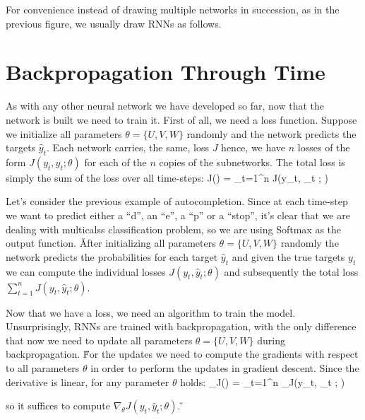For convenience instead of drawing multiple networks in succession, as in the previous figure, we usually draw RNNs as
follows.

\vspace{-5pt}


\section{Backpropagation Through Time}

As with any other neural network we have developed so far, now that the network is built we need to train it. First of
all, we need a loss function. Suppose we initialize all parameters $\theta = \{U, V, W\}$ randomly and the network
predicts the targets $\hat{y}_t$. Each network carries, the same, loss $J$ hence, we have $n$ losses of the form
$J(y_t, \hat{y}_t ; \theta)$ for each of the $n$ copies of the subnetworks. The total loss is simply the sum of the
loss over all time-steps:
\bse
J(\theta) = \sum_{t=1}^{n} J(y_t, _t ; \theta)
\ese

\be
Let's consider the previous example of autocompletion. Since at each time-step we want to predict either a ``d'', an
``e'', a ``p'' or a ``stop'', it's clear that we are dealing with multicalss classification problem, so we are using
Softmax as the output function. \v

After initializing all parameters $\theta = \{U, V, W\}$ randomly the network predicts the probabilities for each
target $\hat{y}_t$ and given the true targets $y_t$ we can compute the individual losses $J(y_t, \hat{y}_t ; \theta)$
and subsequently the total loss $\sum_{t=1}^{n} J(y_t, \hat{y}_t ; \theta)$.

\ee

Now that we have a loss, we need an algorithm to train the model. Unsurprisingly, RNNs are trained with
backpropagation, with the only difference that now we need to update all parameters $\theta = \{U, V, W\}$ during
backpropagation. \v

For the updates we need to compute the gradients with respect to all parameters $\theta$ in order to perform the
updates in gradient descent. Since the derivative is linear, for any parameter $\theta$ holds:
\bse
\nabla_\theta J(\theta) = \sum_{t=1}^{n} \nabla_\theta J(y_t, _t ; \theta)
\ese

so it suffices to compute $\nabla_\theta J(y_t, \hat{y}_t ; \theta)$. \v

